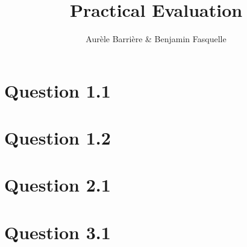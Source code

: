 \documentclass{article}
\author{Aur\`ele Barri\`ere \& Benjamin Fasquelle}
\title{Practical Evaluation}
\begin{document}
\maketitle

\section*{Question 1.1}

\section*{Question 1.2}

\section*{Question 2.1}

\section*{Question 3.1}
\end{document}
